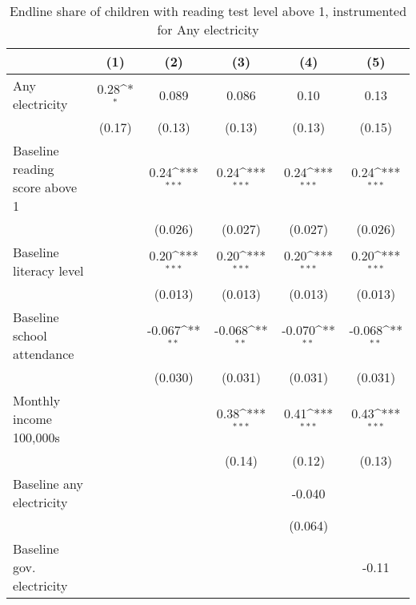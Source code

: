 \begin{table}[htbp]\centering
\def\sym#1{\ifmmode^{#1}\else\(^{#1}\)\fi}
\caption{Endline share of children with reading test level above 1, instrumented for Any electricity}
\begin{tabular*}{1\hsize}{@{\hskip\tabcolsep\extracolsep\fill}l*{5}{c}}
\toprule
                &\multicolumn{1}{c}{(1)}         &\multicolumn{1}{c}{(2)}         &\multicolumn{1}{c}{(3)}         &\multicolumn{1}{c}{(4)}         &\multicolumn{1}{c}{(5)}         \\
\midrule
Any electricity &     0.28\sym{*}  &    0.089         &    0.086         &     0.10         &     0.13         \\
                &   (0.17)         &   (0.13)         &   (0.13)         &   (0.13)         &   (0.15)         \\
Baseline reading score above 1&                  &     0.24\sym{***}&     0.24\sym{***}&     0.24\sym{***}&     0.24\sym{***}\\
                &                  &  (0.026)         &  (0.027)         &  (0.027)         &  (0.026)         \\
Baseline literacy level&                  &     0.20\sym{***}&     0.20\sym{***}&     0.20\sym{***}&     0.20\sym{***}\\
                &                  &  (0.013)         &  (0.013)         &  (0.013)         &  (0.013)         \\
Baseline school attendance&                  &   -0.067\sym{**} &   -0.068\sym{**} &   -0.070\sym{**} &   -0.068\sym{**} \\
                &                  &  (0.030)         &  (0.031)         &  (0.031)         &  (0.031)         \\
Monthly income 100,000s&                  &                  &     0.38\sym{***}&     0.41\sym{***}&     0.43\sym{***}\\
                &                  &                  &   (0.14)         &   (0.12)         &   (0.13)         \\
Baseline any electricity&                  &                  &                  &   -0.040         &                  \\
                &                  &                  &                  &  (0.064)         &                  \\
Baseline gov. electricity&                  &                  &                  &                  &    -0.11         \\

\end{tabular*}
\end{table}
